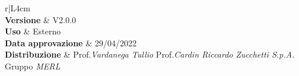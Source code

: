 \begin{center}
	\begin{tabular}{r|L{4cm}}
			 \\
			\hline
			\textbf{Versione}			& V2.0.0 \\
			\textbf{Uso}		& Esterno \\
			\textbf{Data approvazione} 			& 29/04/2022 \\
			\textbf{Distribuzione} 	&	Prof.\textit{Vardanega Tullio} \newline Prof.\textit{Cardin Riccardo} \newline \textit{Zucchetti S.p.A.} \newline Gruppo \textit{MERL} \\
	\end{tabular}
\end{center}
